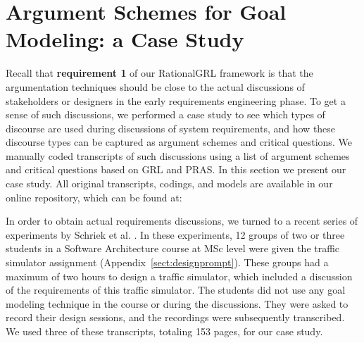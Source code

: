 \section{Argument Schemes for Goal Modeling: a Case Study}
\label{sect:gmas}

Recall that \textbf{requirement 1} of our RationalGRL framework is that the argumentation techniques should be close to the actual discussions of stakeholders or designers in the early requirements engineering phase. To get a sense of such discussions, we performed a case study to see which types of discourse are used during discussions of system requirements, and how these discourse types can be captured as argument schemes and critical questions. We manually coded transcripts of such discussions using a list of argument schemes and critical questions based on GRL and PRAS. In this section we present our case study. All original transcripts, codings, and models are available in our online repository, which can be found at:  
 
\begin{quote}
\rationalgrlurl{}
\end{quote}

In order to obtain actual requirements discussions, we turned to a recent series of experiments by Schriek et al. \cite{SchriekEtal2016}. In these experiments, 12 groups of two or three students in a Software Architecture course at MSc level were given the traffic simulator assignment (Appendix~\ref{sect:designprompt}). These groups had a maximum of two hours to design a traffic simulator, which included a discussion of the requirements of this traffic simulator. The students did not use any goal modeling technique in the course or during the discussions. They were asked to record their design sessions, and the recordings were subsequently transcribed. We used three of these transcripts, totaling 153 pages, for our case study. 


